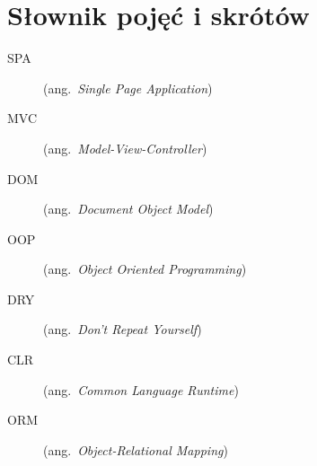 \chapter*{Słownik pojęć i skrótów}\mbox{}
\label{sec:skroty}
\noindent
\begin{description}
  \item [SPA] (ang.\ \emph{Single Page Application})
  \item [MVC] (ang.\ \emph{Model-View-Controller})
  \item [DOM] (ang.\ \emph{Document Object Model})
  \item [OOP] (ang.\ \emph{Object Oriented Programming})
  \item [DRY] (ang.\ \emph{Don't Repeat Yourself})
  \item [CLR] (ang.\ \emph{Common Language Runtime})
  \item [ORM] (ang.\ \emph{Object-Relational Mapping})
  
  
\end{description}
